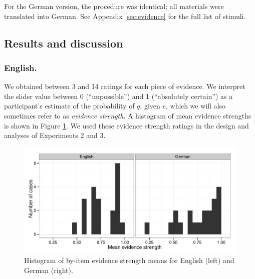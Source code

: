 \documentclass[11pt]{article}
\newcommand{\red}[1]{\textcolor{Red}{#1}}
\newcommand{\figref}[1]{Figure \ref{#1}}
\newcommand{\appref}[1]{Appendix \ref{#1}}
\begin{document}
For the German version, the procedure was identical; all materials were translated into German. See \appref{sec:evidence} for the full list of stimuli.

\subsection{Results and discussion}

\subsubsection{English.}
We obtained between 3 and 14 ratings for each piece of evidence. We interpret the slider value between 0 (``impossible'') and 1 (``absolutely certain'') as a participant's estimate of the probability of $q$, given $e$, which we will also sometimes refer to as  \emph{evidence strength}. A histogram of mean evidence strengths is shown in \figref{fig:evidencestrength}.  We used these evidence strength ratings in the design and analyses of Experiments 2 and 3.

\begin{figure}
\centering
\includegraphics[width=.9\textwidth]{pics/evidencestrength-histograms}
\caption{Histogram of by-item evidence strength means  for English (left) and German (right).}
\label{fig:evidencestrength}
\end{figure}

\end{document}
